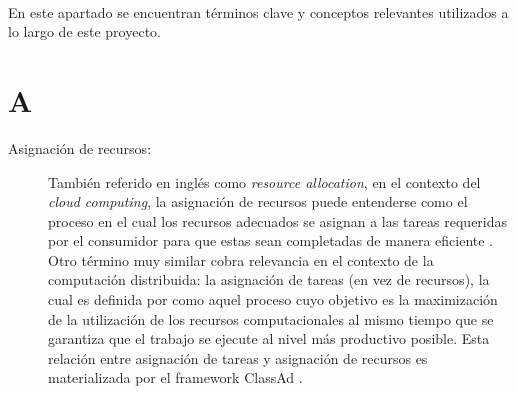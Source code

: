\label{cap:glosario}
\mbox{}\\
En este apartado se encuentran términos clave y conceptos relevantes utilizados a lo largo de este proyecto.

\section*{A}
\begin{description}
	\item[Asignación de recursos:] También referido en inglés como \textit{resource allocation}, en el contexto del \textit{cloud computing}, la asignación de recursos puede entenderse como el proceso en el cual los recursos adecuados se asignan a las tareas requeridas por el consumidor para que estas sean completadas de manera eficiente \citep{Manzoor2020}. Otro término muy similar cobra relevancia en el contexto de la computación distribuida: la asignación de tareas (en vez de recursos), la cual es definida por \cite{Oldham1995} como aquel proceso cuyo objetivo es la maximización de la utilización de los recursos computacionales al mismo tiempo que se garantiza que el trabajo se ejecute al nivel más productivo posible. Esta relación entre asignación de tareas y asignación de recursos es materializada por el framework ClassAd \citep{Thain2005}.
\end{description}

